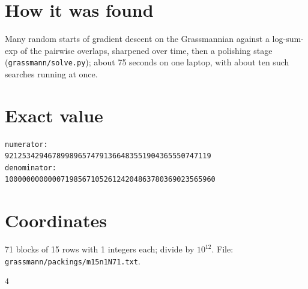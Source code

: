 \documentclass[11pt,a4paper]{article}
\begin{document}
\section{How it was found}
Many random starts of gradient descent on the Grassmannian against a log-sum-exp of the pairwise overlaps, sharpened over time, then a polishing stage (\texttt{grassmann/solve.py}); about 75 seconds on one laptop, with about ten such searches running at once.


\appendix
\section{Exact value}
{\small
\begin{verbatim}
numerator:
921253429467899896574791366483551904365550747119
denominator:
1000000000000719856710526124204863780369023565960
\end{verbatim}}

\section{Coordinates}
71 blocks of 15 rows with 1 integers each; divide by $10^{12}$. File: \texttt{grassmann/packings/m15n1N71.txt}.
{\tiny
\begin{multicols}{4}
\end{multicols}}
\end{document}
